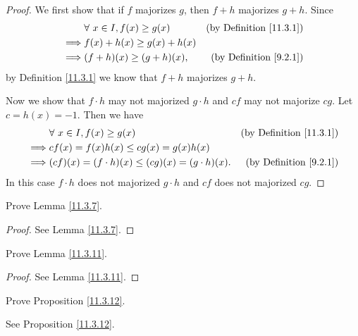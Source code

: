 \begin{proof}
    We first show that if \(f\) majorizes \(g\), then \(f + h\) majorizes \(g + h\).
    Since
    \begin{align*}
                 & \forall\ x \in I, f(x) \geq g(x) & \text{(by Definition \ref{11.3.1})} \\
        \implies & f(x) + h(x) \geq g(x) + h(x)                                           \\
        \implies & (f + h)(x) \geq (g + h)(x),      & \text{(by Definition \ref{9.2.1})}
    \end{align*}
    by Definition \ref{11.3.1} we know that \(f + h\) majorizes \(g + h\).

    Now we show that \(f \cdot h\) may not majorized \(g \cdot h\) and \(cf\) may not majorize \(cg\).
    Let \(c = h(x) = -1\).
    Then we have
    \begin{align*}
                 & \forall\ x \in I, f(x) \geq g(x)                        & \text{(by Definition \ref{11.3.1})} \\
        \implies & cf(x) = f(x) h(x) \leq cg(x) = g(x) h(x)                                                      \\
        \implies & (cf)(x) = (f \cdot h)(x) \leq (cg)(x) = (g \cdot h)(x). & \text{(by Definition \ref{9.2.1})}
    \end{align*}
    In this case \(f \cdot h\) does not majorized \(g \cdot h\) and \(cf\) does not majorized \(cg\).
\end{proof}

\begin{exercise}\label{ex 11.3.3}
    Prove Lemma \ref{11.3.7}.
\end{exercise}

\begin{proof}
    See Lemma \ref{11.3.7}.
\end{proof}

\begin{exercise}\label{ex 11.3.4}
    Prove Lemma \ref{11.3.11}.
\end{exercise}

\begin{proof}
    See Lemma \ref{11.3.11}.
\end{proof}

\begin{exercise}\label{ex 11.3.5}
    Prove Proposition \ref{11.3.12}.
\end{exercise}

\begin{proposition}
    See Proposition \ref{11.3.12}.
\end{proposition}